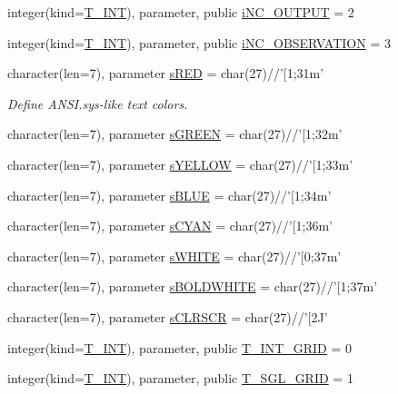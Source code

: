 \begin{DoxyCompactItemize}
\item 
integer(kind=\hyperlink{namespacetypes_a4e4d040a4425196c4d43be63e7e6103a}{T\_\-INT}), parameter, public \hyperlink{namespacetypes_a830e5ccbb0e18b2ee9a748baf073a047}{iNC\_\-OUTPUT} = 2
\item 
integer(kind=\hyperlink{namespacetypes_a4e4d040a4425196c4d43be63e7e6103a}{T\_\-INT}), parameter, public \hyperlink{namespacetypes_a9b12c2d37849090214258503062fc8d6}{iNC\_\-OBSERVATION} = 3
\item 
character(len=7), parameter \hyperlink{namespacetypes_abb0ecc9c9b6f0e08002fec018d71001c}{sRED} = char(27)//'\mbox{[}1;31m'
\begin{DoxyCompactList}\small\item\em Define ANSI.sys-\/like text colors. \item\end{DoxyCompactList}\item 
character(len=7), parameter \hyperlink{namespacetypes_a07437ed48493a8bc7c3f5f73bd3b09ea}{sGREEN} = char(27)//'\mbox{[}1;32m'
\item 
character(len=7), parameter \hyperlink{namespacetypes_aea7cf70fa292d9310d8684a10a075b10}{sYELLOW} = char(27)//'\mbox{[}1;33m'
\item 
character(len=7), parameter \hyperlink{namespacetypes_a4bb1513c56bea1b41dd352849448a56c}{sBLUE} = char(27)//'\mbox{[}1;34m'
\item 
character(len=7), parameter \hyperlink{namespacetypes_a9bd2b67f7cec3b5778aa09574fa71152}{sCYAN} = char(27)//'\mbox{[}1;36m'
\item 
character(len=7), parameter \hyperlink{namespacetypes_a71a8a20288478902850fec078b982946}{sWHITE} = char(27)//'\mbox{[}0;37m'
\item 
character(len=7), parameter \hyperlink{namespacetypes_aefdf6f19388973d1aa8709be595c7c32}{sBOLDWHITE} = char(27)//'\mbox{[}1;37m'
\item 
character(len=7), parameter \hyperlink{namespacetypes_a92bb3d719410aa879a5823ffc5c3f647}{sCLRSCR} = char(27)//'\mbox{[}2J'
\item 
integer(kind=\hyperlink{namespacetypes_a4e4d040a4425196c4d43be63e7e6103a}{T\_\-INT}), parameter, public \hyperlink{namespacetypes_acc2ffd0be776cd4fca9ebcfe4669e82c}{T\_\-INT\_\-GRID} = 0
\item 
integer(kind=\hyperlink{namespacetypes_a4e4d040a4425196c4d43be63e7e6103a}{T\_\-INT}), parameter, public \hyperlink{namespacetypes_a328c49f52da66eddb0a59f71ea4235a3}{T\_\-SGL\_\-GRID} = 1
\item 

\end{DoxyCompactItemize}
